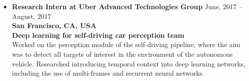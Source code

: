 \documentclass[10pt,letterpaper]{article}
\newcommand{\thing}[2]{{#1} \hfill {#2}}
\begin{document}
\begin{itemize}
\item \thing{\bf Research Intern at Uber Advanced Technologies Group}{June, 2017 -- August, 2017}\\
        {\bf San Francisco, CA, USA} \\
        {\bf Deep learning for self-driving car perception team}\vspace{0.5em}\\
        Worked on the perception module of the self-driving pipeline, where the aim was to detect all targets of interest in the environment of the autonomous vehicle. Researched introducing temporal context into deep learning networks, including the use of multi-frames and recurrent neural networks.
	

\end{itemize}


\vspace{-1.5em}
\end{document}
